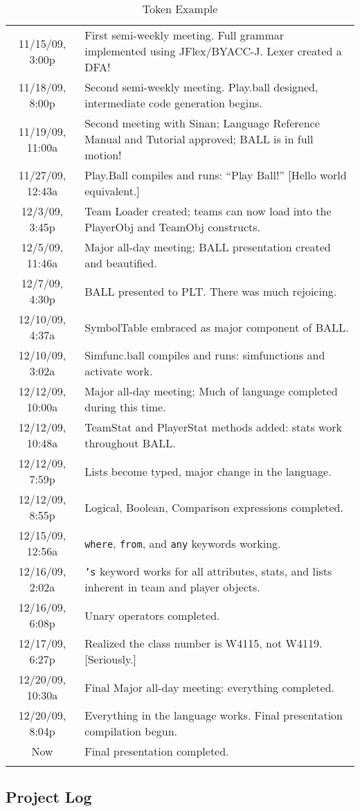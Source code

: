 \begin{center}
\begin{longtable}{|c|p{10cm}|}
11/15/09, 3:00p & First semi-weekly meeting. Full grammar implemented
using JFlex/BYACC-J. Lexer created a DFA!\\
11/18/09, 8:00p & Second semi-weekly meeting. Play.ball designed,
intermediate code generation begins.\\
11/19/09, 11:00a & Second meeting with Sinan; Language Reference
Manual and Tutorial approved; BALL is in full motion!\\
11/27/09, 12:43a & Play.Ball compiles and runs: ``Play Ball!'' [Hello
  world equivalent.]\\
12/3/09, 3:45p & Team Loader created; teams can now load into the
PlayerObj and TeamObj constructs.\\
12/5/09, 11:46a & Major all-day meeting; BALL presentation created and
beautified.\\
12/7/09, 4:30p & BALL presented to PLT. There was much rejoicing.\\
12/10/09, 4:37a & SymbolTable embraced as major component of BALL.\\
12/10/09, 3:02a & Simfunc.ball compiles and runs: simfunctions and
activate work.\\
12/12/09, 10:00a & Major all-day meeting; Much of language completed
during this time.\\
12/12/09, 10:48a & TeamStat and PlayerStat methods added: stats work
throughout BALL.\\
12/12/09, 7:59p & Lists become typed, major change in the language.\\
12/12/09, 8:55p & Logical, Boolean, Comparison expressions completed.\\
12/15/09, 12:56a & \texttt{where}, \texttt{from}, and \texttt{any} keywords working.\\
12/16/09, 2:02a & \texttt{'s} keyword works for all attributes, stats, and
lists inherent in team and player objects.\\
12/16/09, 6:08p & Unary operators completed.\\
12/17/09, 6:27p & Realized the class number is W4115, not
W4119. [Seriously.]\\
12/20/09, 10:30a & Final Major all-day meeting: everything completed.\\
12/20/09, 8:04p & Everything in the language works. Final presentation
compilation begun.\\
Now & Final presentation completed.\\

\hline
\caption{Token Example}
\label{token example}
\end{longtable}
\end{center}

\subsection{Project Log}


